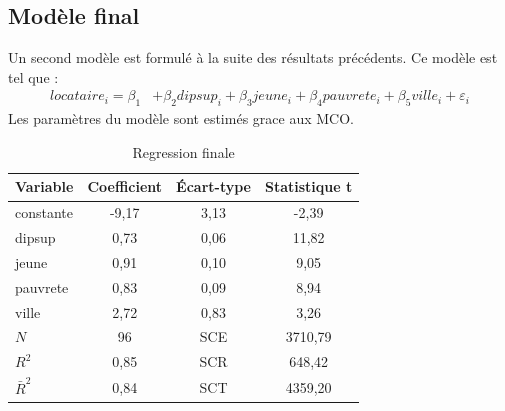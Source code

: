 \documentclass[12pt]{article}
\begin{document}
\subsection{Modèle final}
Un second modèle est formulé à la suite des résultats précédents. Ce modèle est tel que :
\begin{equation*}
    \begin{split}
            locataire_i =  \beta_1 &+ \beta_2dipsup_i + \beta_3jeune_i + \beta_4pauvrete_i + \beta_5ville_i+\varepsilon_i 
    \end{split}
\end{equation*}
Les paramètres du modèle sont estimés grace aux MCO.
\begin{table}[H]
\centering
\caption{Regression finale}
\label{table:secondeReg}
\begin{tabular}{l*{1}{ccc}}
\toprule
Variable            & Coefficient&  Écart-type&Statistique t\\
\midrule
constante      &   -9,17&    3,13&   -2,39\\
dipsup&    0,73 &    0,06&    11,82\\
jeune  &     0,91 &    0,10&    9,05\\
pauvrete&    0,83 &     0,09 &   8,94\\
ville &   2,72 &  0,83   &  3,26 \\
\midrule
$N$       &          96& SCE & 3710,79           \\
$R^{2}$ & 0,85 &       SCR & 648,42   \\ 
$\bar{R}^2$ & 0,84 &   SCT & 4359,20 \\ 
\bottomrule
\end{tabular}
\end{table}
\end{document}
